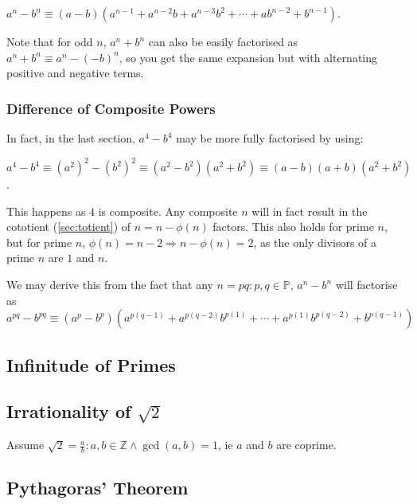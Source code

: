 \documentclass[a4paper,11pt]{article}
\begin{document}
    $a^n - b^n \equiv (a - b)(a^{n - 1} + a^{n - 2}b + a^{n - 3}b^2 + \cdots +
                              ab^{n - 2} + b^{n - 1})$.

    Note that for odd $n$, $a^n + b^n$ can also be easily factorised as
    $a^n + b^n \equiv a^n - (-b)^n$, so you get the same expansion but with
    alternating positive and negative terms.


    \subsubsection{Difference of Composite Powers}

    In fact, in the last section, $a^4 - b^4$ may be more fully factorised by
    using:

    $a^4 - b^4 \equiv (a^2)^2 - (b^2)^2 \equiv (a^2 - b^2)(a^2 + b^2) \equiv
        (a - b)(a + b)(a^2 + b^2)$.

    This happens as $4$ is composite. Any composite $n$ will in fact result in
    the cototient (\ref{sec:totient}) of $n = n - \phi(n)$ factors. This also
    holds for prime $n$, but for prime
    $n$, $\phi(n) = n - 2 \Rightarrow n - \phi(n) = 2$, as the only divisors of
    a prime $n$ are $1$ and $n$.

    We may derive this from the fact that any $n = pq: p, q \in \mathbb{P}$,
    $a^n - b^n$ will factorise as
    \\$a^{pq} - b^{pq} \equiv
     (a^p - b^p)(a^{p(q - 1)} + a^{p(q - 2)}b^{p(1)} + \cdots +
                 a^{p(1)}b^{p(q - 2)} + b^{p(q - 1)})$

    \subsection{Infinitude of Primes}

    \subsection[Irrationality of $\sqrt 2$]{Irrationality of \boldmath$\sqrt 2$}

    Assume $\sqrt 2 = \frac ab : a, b \in \mathbb{Z} \land \gcd(a, b) = 1$, ie
    $a$ and $b$ are coprime.

    \subsection{Pythagoras' Theorem} \label{sec:pythagoras}
\end{document}
